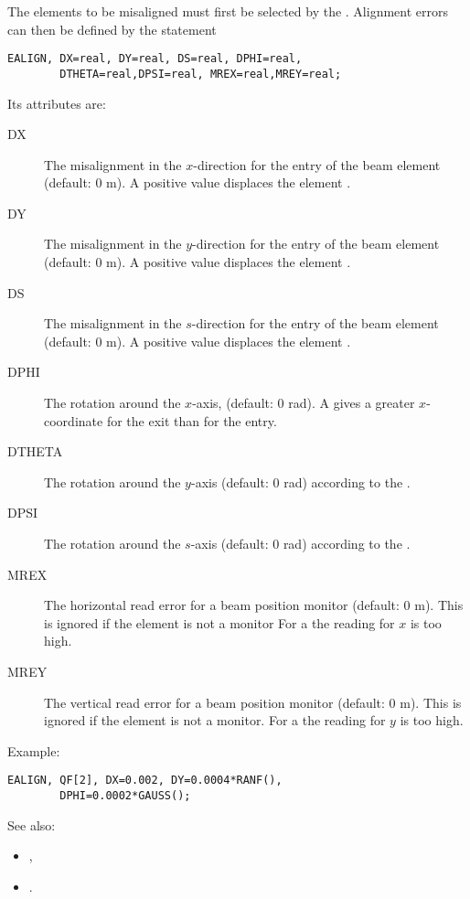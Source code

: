 The elements to be misaligned must first be selected by the 
.
Alignment errors can then be defined by the statement
\begin{verbatim}
EALIGN, DX=real, DY=real, DS=real, DPHI=real, 
        DTHETA=real,DPSI=real, MREX=real,MREY=real;
\end{verbatim}
Its attributes are:
\begin{description}
\item[DX]
  The misalignment in the $x$-direction
  for the entry of the beam element (default: 0 m).
  A positive value displaces the element 
  .
\item[DY]
  The misalignment in the $y$-direction
  for the entry of the beam element (default: 0 m).
  A positive value displaces the element 
  .
\item[DS]
  The misalignment in the $s$-direction
  for the entry of the beam element (default: 0 m).
  A positive value displaces the element 
  .
\item[DPHI]
  The rotation around the $x$-axis, (default: 0 rad).
  A  gives a greater $x$-coordinate for the exit 
  than for the entry.
\item[DTHETA]
  The rotation around the $y$-axis (default: 0 rad) according to 
  the .
\item[DPSI]
  The rotation around the $s$-axis (default: 0 rad) according to 
  the .
\item[MREX]
  The horizontal read error for a beam position monitor (default: 0 m).
  This is ignored if the element is not a monitor
  For a  the reading for $x$ is too high.
\item[MREY]
  The vertical read error for a beam position monitor (default: 0 m).
  This is ignored if the element is not a monitor.
  For a  the reading for $y$ is too high.
\end{description}
Example:
\begin{verbatim}
EALIGN, QF[2], DX=0.002, DY=0.0004*RANF(), 
        DPHI=0.0002*GAUSS();
\end{verbatim}
See also: 
\begin{itemize}
\item {},
\item {}.
\end{itemize}

